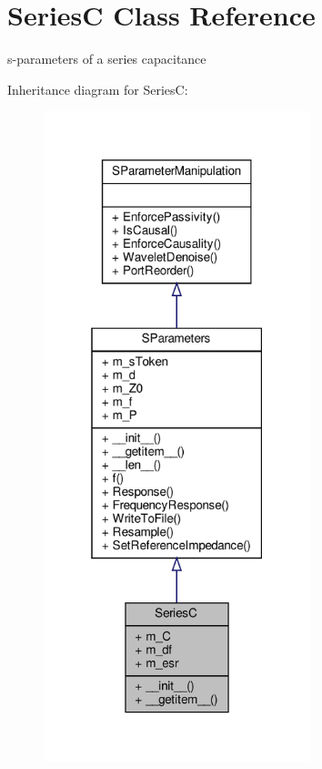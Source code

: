 \hypertarget{classSignalIntegrity_1_1SParameters_1_1Devices_1_1SeriesC_1_1SeriesC}{}\section{SeriesC Class Reference}
\label{classSignalIntegrity_1_1SParameters_1_1Devices_1_1SeriesC_1_1SeriesC}


s-\/parameters of a series capacitance  




Inheritance diagram for SeriesC\+:\nopagebreak
\begin{figure}[H]
\begin{center}
\leavevmode
\includegraphics[width=220pt]{classSignalIntegrity_1_1SParameters_1_1Devices_1_1SeriesC_1_1SeriesC__inherit__graph}
\end{center}
\end{figure}


